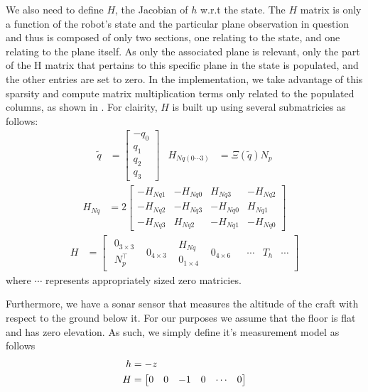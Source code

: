 \documentclass[]{article}
\begin{document}
{We also need to define $H$, the Jacobian of $h$ w.r.t the state. The $H$ matrix is only a function of the robot's state and the particular plane observation in question and thus is composed of only two sections, one relating to the state, and one relating to the plane itself. As only the associated plane is relevant, only the part of the H matrix that pertains to this specific plane in the state is populated, and the other entries are set to zero.
In the implementation, we take advantage of this sparsity and compute matrix multiplication terms only related to the populated columns, as shown in \cite{Sola2013}.
For clairity, $H$ is built up using several submatricies as follows:
\begin{align}
	\tilde{q} &= 
	\left[
	\begin{matrix}
		-q_0 \\
		q_1 \\
		q_2 \\
		q_3
	\end{matrix}
	\right]
	&
	H_{Nq(0\cdots3)} &= \Xi(\tilde{q}) N_p
\end{align}
\begin{align}
	H_{Nq} &= 2
	\left[
	\begin{matrix}
		-H_{Nq1} 	& -H_{Nq0} 	& H_{Nq3} 	& -H_{Nq2} \\
		-H_{Nq2} 	& -H_{Nq3} 	& -H_{Nq0} 	& H_{Nq1} \\
		-H_{Nq3} 	& H_{Nq2} 	& -H_{Nq1} 	& -H_{Nq0}
	\end{matrix}
	\right]
\end{align}
\begin{align}
	\label{eqn:H}
	H &=
	\left[
	\begin{matrix}
		\begin{matrix}
			0_{3 \times 3} \\
			N_p^\top
		\end{matrix}
		& 0_{4 \times 3}
		&
		\begin{matrix}
			H_{Nq} \\
			0_{1 \times 4}
		\end{matrix}
		& 0_{4 \times 6}
		&
		& \cdots
		& T_h
		& \cdots
	\end{matrix}
	\right]
\end{align}
where $\cdots$ represents appropriately sized zero matricies.

Furthermore, we have a sonar sensor that measures the altitude of the craft with respect to the ground below it. For our purposes we assume that the floor is flat and has zero elevation. As such, we simply define it's measurement model as follows
\begin{align}
	h &= -z \notag \\
	H &= \left[
	\begin{matrix}
		0 & 0 & -1 & 0 & \cdots & 0
	\end{matrix}
	\right]
\end{align}

}
\end{document}
